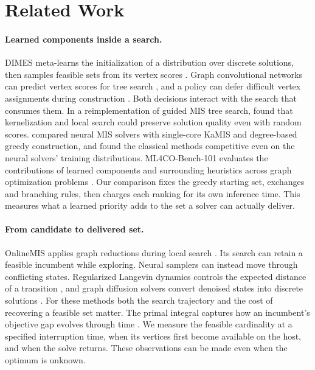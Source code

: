 \section{Related Work}

\paragraph{Learned components inside a search.}
DIMES meta-learns the initialization of a distribution over discrete solutions, then samples feasible sets from its vertex scores \citep{qiu2022dimes}. Graph convolutional networks can predict vertex scores for tree search \citep{li2018guided}, and a policy can defer difficult vertex assignments during construction \citep{ahn2020defer}. Both decisions interact with the search that consumes them. In a reimplementation of guided MIS tree search, \citet{boether2022tree} found that kernelization and local search could preserve solution quality even with random scores. \citet{wu2026unrealized} compared neural MIS solvers with single-core KaMIS and degree-based greedy construction, and found the classical methods competitive even on the neural solvers' training distributions. ML4CO-Bench-101 evaluates the contributions of learned components and surrounding heuristics across graph optimization problems \citep{ma2025ml4co}. Our comparison fixes the greedy starting set, exchanges and branching rules, then charges each ranking for its own inference time. This measures what a learned priority adds to the set a solver can actually deliver.

\paragraph{From candidate to delivered set.}
OnlineMIS applies graph reductions during local search \citep{dahlum2016accelerating}. Its search can retain a feasible incumbent while exploring. Neural samplers can instead move through conflicting states. Regularized Langevin dynamics controls the expected distance of a transition \citep{feng2025regularized}, and graph diffusion solvers convert denoised states into discrete solutions \citep{sun2023difusco,sanokowski2024diffusion}. For these methods both the search trajectory and the cost of recovering a feasible set matter. The primal integral captures how an incumbent's objective gap evolves through time \citep{berthold2013primal}. We measure the feasible cardinality at a specified interruption time, when its vertices first become available on the host, and when the solve returns. These observations can be made even when the optimum is unknown.
